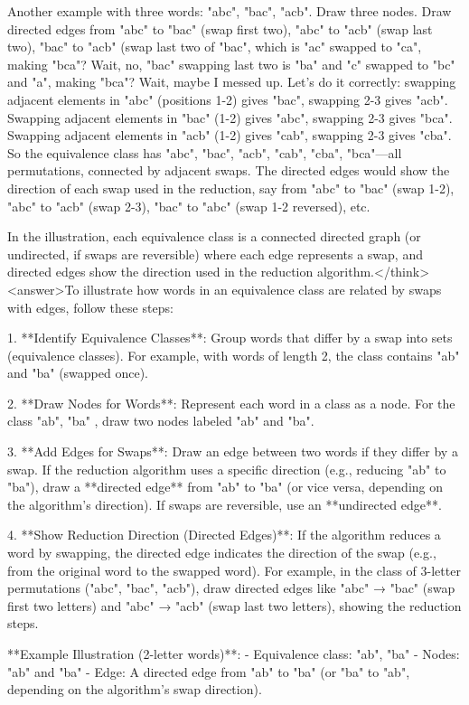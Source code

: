 Another example with three words: "abc", "bac", "acb". Draw three nodes. Draw directed edges from "abc" to "bac" (swap first two), "abc" to "acb" (swap last two), "bac" to "acb" (swap last two of "bac", which is "ac" swapped to "ca", making "bca"? Wait, no, "bac" swapping last two is "ba" and "c" swapped to "bc" and "a", making "bca"? Wait, maybe I messed up. Let's do it correctly: swapping adjacent elements in "abc" (positions 1-2) gives "bac", swapping 2-3 gives "acb". Swapping adjacent elements in "bac" (1-2) gives "abc", swapping 2-3 gives "bca". Swapping adjacent elements in "acb" (1-2) gives "cab", swapping 2-3 gives "cba". So the equivalence class has "abc", "bac", "acb", "cab", "cba", "bca"—all permutations, connected by adjacent swaps. The directed edges would show the direction of each swap used in the reduction, say from "abc" to "bac" (swap 1-2), "abc" to "acb" (swap 2-3), "bac" to "abc" (swap 1-2 reversed), etc.

In the illustration, each equivalence class is a connected directed graph (or undirected, if swaps are reversible) where each edge represents a swap, and directed edges show the direction used in the reduction algorithm.</think><answer>To illustrate how words in an equivalence class are related by swaps with edges, follow these steps:  

1. **Identify Equivalence Classes**: Group words that differ by a swap into sets (equivalence classes). For example, with words of length 2, the class contains "ab" and "ba" (swapped once).  

2. **Draw Nodes for Words**: Represent each word in a class as a node. For the class { "ab", "ba" }, draw two nodes labeled "ab" and "ba".  

3. **Add Edges for Swaps**: Draw an edge between two words if they differ by a swap. If the reduction algorithm uses a specific direction (e.g., reducing "ab" to "ba"), draw a **directed edge** from "ab" to "ba" (or vice versa, depending on the algorithm’s direction). If swaps are reversible, use an **undirected edge**.  

4. **Show Reduction Direction (Directed Edges)**: If the algorithm reduces a word by swapping, the directed edge indicates the direction of the swap (e.g., from the original word to the swapped word). For example, in the class of 3-letter permutations ("abc", "bac", "acb"), draw directed edges like "abc" → "bac" (swap first two letters) and "abc" → "acb" (swap last two letters), showing the reduction steps.  

**Example Illustration (2-letter words)**:  
- Equivalence class: { "ab", "ba" }  
- Nodes: "ab" and "ba"  
- Edge: A directed edge from "ab" to "ba" (or "ba" to "ab", depending on the algorithm’s swap direction).  

